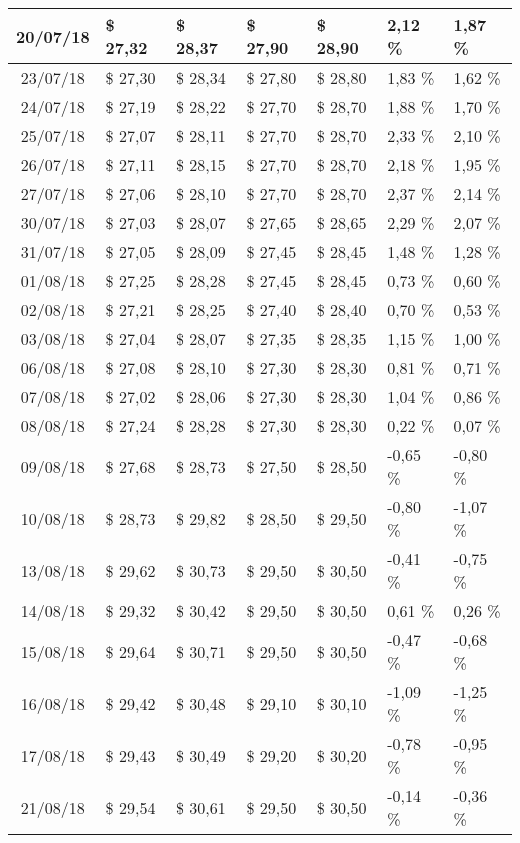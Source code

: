 \begin{center}
\begin{longtable}{|c|p{1.5cm}|p{1.5cm}|p{1.5cm}|p{1.5cm}|p{1.5cm}|p{1.5cm}|}
20/07/18 & \$ 27,32 & \$ 28,37 & \$ 27,90 & \$ 28,90 & 2,12 \% & 1,87 \% \\ \hline
23/07/18 & \$ 27,30 & \$ 28,34 & \$ 27,80 & \$ 28,80 & 1,83 \% & 1,62 \% \\ \hline
24/07/18 & \$ 27,19 & \$ 28,22 & \$ 27,70 & \$ 28,70 & 1,88 \% & 1,70 \% \\ \hline
25/07/18 & \$ 27,07 & \$ 28,11 & \$ 27,70 & \$ 28,70 & 2,33 \% & 2,10 \% \\ \hline
26/07/18 & \$ 27,11 & \$ 28,15 & \$ 27,70 & \$ 28,70 & 2,18 \% & 1,95 \% \\ \hline
27/07/18 & \$ 27,06 & \$ 28,10 & \$ 27,70 & \$ 28,70 & 2,37 \% & 2,14 \% \\ \hline
30/07/18 & \$ 27,03 & \$ 28,07 & \$ 27,65 & \$ 28,65 & 2,29 \% & 2,07 \% \\ \hline
31/07/18 & \$ 27,05 & \$ 28,09 & \$ 27,45 & \$ 28,45 & 1,48 \% & 1,28 \% \\ \hline
01/08/18 & \$ 27,25 & \$ 28,28 & \$ 27,45 & \$ 28,45 & 0,73 \% & 0,60 \% \\ \hline
02/08/18 & \$ 27,21 & \$ 28,25 & \$ 27,40 & \$ 28,40 & 0,70 \% & 0,53 \% \\ \hline
03/08/18 & \$ 27,04 & \$ 28,07 & \$ 27,35 & \$ 28,35 & 1,15 \% & 1,00 \% \\ \hline
06/08/18 & \$ 27,08 & \$ 28,10 & \$ 27,30 & \$ 28,30 & 0,81 \% & 0,71 \% \\ \hline
07/08/18 & \$ 27,02 & \$ 28,06 & \$ 27,30 & \$ 28,30 & 1,04 \% & 0,86 \% \\ \hline
08/08/18 & \$ 27,24 & \$ 28,28 & \$ 27,30 & \$ 28,30 & 0,22 \% & 0,07 \% \\ \hline
09/08/18 & \$ 27,68 & \$ 28,73 & \$ 27,50 & \$ 28,50 & -0,65 \% & -0,80 \% \\ \hline
10/08/18 & \$ 28,73 & \$ 29,82 & \$ 28,50 & \$ 29,50 & -0,80 \% & -1,07 \% \\ \hline
13/08/18 & \$ 29,62 & \$ 30,73 & \$ 29,50 & \$ 30,50 & -0,41 \% & -0,75 \% \\ \hline
14/08/18 & \$ 29,32 & \$ 30,42 & \$ 29,50 & \$ 30,50 & 0,61 \% & 0,26 \% \\ \hline
15/08/18 & \$ 29,64 & \$ 30,71 & \$ 29,50 & \$ 30,50 & -0,47 \% & -0,68 \% \\ \hline
16/08/18 & \$ 29,42 & \$ 30,48 & \$ 29,10 & \$ 30,10 & -1,09 \% & -1,25 \% \\ \hline
17/08/18 & \$ 29,43 & \$ 30,49 & \$ 29,20 & \$ 30,20 & -0,78 \% & -0,95 \% \\ \hline
21/08/18 & \$ 29,54 & \$ 30,61 & \$ 29,50 & \$ 30,50 & -0,14 \% & -0,36 \% \\ \hline

\end{longtable}
\end{center}
